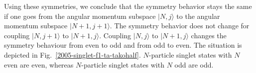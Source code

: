 \documentclass[pra,amsfonts,showpacs,preprint,showkeys]{revtex4}
\begin{document}
Using these symmetries, we conclude that the symmetry behavior
stays the same if one goes from the angular momentum subspace
$|N,j\rangle$ to the angular momentum subspace $|N+1,j+1\rangle$.
The symmetry behavior does not change for coupling $|N,j+1\rangle$
to $|N+1,j\rangle$.
Coupling $|N,j\rangle$ to $|N+1,j\rangle$ changes the symmetry behaviour from even to
odd and from odd to even.
The situation is depicted in
Fig.~\ref{2005-singlet-f1-ta-takohalf}.
$N$-particle singlet states with $N$ even are even,
whereas $N$-particle singlet states with $N$ odd are odd.
\end{document}
